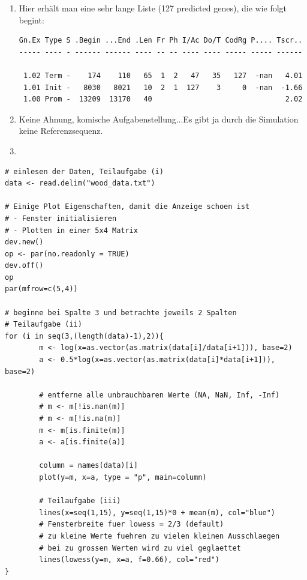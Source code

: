 \documentclass{homework}
\begin{document}
\begin{enumerate}
\begin{enumerate}
\item 
Hier erhält man eine sehr lange Liste (127 predicted genes), die wie folgt begint:
\begin{verbatim}
Gn.Ex Type S .Begin ...End .Len Fr Ph I/Ac Do/T CodRg P.... Tscr..
----- ---- - ------ ------ ---- -- -- ---- ---- ----- ----- ------

 1.02 Term -    174    110   65  1  2   47   35   127  -nan   4.01
 1.01 Init -   8030   8021   10  2  1  127    3     0  -nan  -1.66
 1.00 Prom -  13209  13170   40                               2.02
\end{verbatim}
\item 
Keine Ahnung, komische Aufgabenstellung...Es gibt ja durch die Simulation keine Referenzsequenz. 
\item 
\end{enumerate}


\begin{verbatim}
# einlesen der Daten, Teilaufgabe (i)
data <- read.delim("wood_data.txt")

# Einige Plot Eigenschaften, damit die Anzeige schoen ist
# - Fenster initialisieren
# - Plotten in einer 5x4 Matrix
dev.new()
op <- par(no.readonly = TRUE)
dev.off()
op
par(mfrow=c(5,4))

# beginne bei Spalte 3 und betrachte jeweils 2 Spalten
# Teilaufgabe (ii)
for (i in seq(3,(length(data)-1),2)){
		m <- log(x=as.vector(as.matrix(data[i]/data[i+1])), base=2)
		a <- 0.5*log(x=as.vector(as.matrix(data[i]*data[i+1])), base=2)
	
		# entferne alle unbrauchbaren Werte (NA, NaN, Inf, -Inf)
		# m <- m[!is.nan(m)]
		# m <- m[!is.na(m)]
		m <- m[is.finite(m)]
		a <- a[is.finite(a)]
		
		column = names(data)[i]				
		plot(y=m, x=a, type = "p", main=column)	

        # Teilaufgabe (iii)
		lines(x=seq(1,15), y=seq(1,15)*0 + mean(m), col="blue")
		# Fensterbreite fuer lowess = 2/3 (default)
		# zu kleine Werte fuehren zu vielen kleinen Ausschlaegen
		# bei zu grossen Werten wird zu viel geglaettet
		lines(lowess(y=m, x=a, f=0.66), col="red")
}
\end{verbatim}


\end{enumerate}
\end{document}
